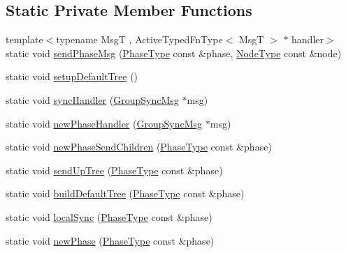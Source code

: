 \subsection*{Static Private Member Functions}
\begin{DoxyCompactItemize}
\item 
{\footnotesize template$<$typename MsgT , Active\+Typed\+Fn\+Type$<$ Msg\+T $>$ $\ast$ handler$>$ }\\static void \hyperlink{structvt_1_1group_1_1global_1_1_default_group_a1f9ca9cbb770369742bb02375c1a9fbe}{send\+Phase\+Msg} (\hyperlink{namespacevt_1_1group_1_1global_a1ad2576a1029e469969bdcd577122ee3}{Phase\+Type} const \&phase, \hyperlink{namespacevt_a866da9d0efc19c0a1ce79e9e492f47e2}{Node\+Type} const \&node)
\item 
static void \hyperlink{structvt_1_1group_1_1global_1_1_default_group_ab1997e857eafb113b1a96dff3fc46399}{setup\+Default\+Tree} ()
\item 
static void \hyperlink{structvt_1_1group_1_1global_1_1_default_group_a06400a99ee69f97c48372d2cb0a8fc85}{sync\+Handler} (\hyperlink{structvt_1_1group_1_1global_1_1_group_sync_msg}{Group\+Sync\+Msg} $\ast$msg)
\item 
static void \hyperlink{structvt_1_1group_1_1global_1_1_default_group_af9665f651b7f77071cd96065dc230dea}{new\+Phase\+Handler} (\hyperlink{structvt_1_1group_1_1global_1_1_group_sync_msg}{Group\+Sync\+Msg} $\ast$msg)
\item 
static void \hyperlink{structvt_1_1group_1_1global_1_1_default_group_ad1e58f42ba1ec0c0ea07cb1da6581d0a}{new\+Phase\+Send\+Children} (\hyperlink{namespacevt_1_1group_1_1global_a1ad2576a1029e469969bdcd577122ee3}{Phase\+Type} const \&phase)
\item 
static void \hyperlink{structvt_1_1group_1_1global_1_1_default_group_a92c68a09bfd5d22070c7314667be8e53}{send\+Up\+Tree} (\hyperlink{namespacevt_1_1group_1_1global_a1ad2576a1029e469969bdcd577122ee3}{Phase\+Type} const \&phase)
\item 
static void \hyperlink{structvt_1_1group_1_1global_1_1_default_group_a2f503c7d6615e558ce08b0de7a1e8bfa}{build\+Default\+Tree} (\hyperlink{namespacevt_1_1group_1_1global_a1ad2576a1029e469969bdcd577122ee3}{Phase\+Type} const \&phase)
\item 
static void \hyperlink{structvt_1_1group_1_1global_1_1_default_group_a4f79d96f09b2f8a2ed4c1139319aa5de}{local\+Sync} (\hyperlink{namespacevt_1_1group_1_1global_a1ad2576a1029e469969bdcd577122ee3}{Phase\+Type} const \&phase)
\item 
static void \hyperlink{structvt_1_1group_1_1global_1_1_default_group_ae37dc75ff9eec3871d0734ac122ecd47}{new\+Phase} (\hyperlink{namespacevt_1_1group_1_1global_a1ad2576a1029e469969bdcd577122ee3}{Phase\+Type} const \&phase)
\end{DoxyCompactItemize}
